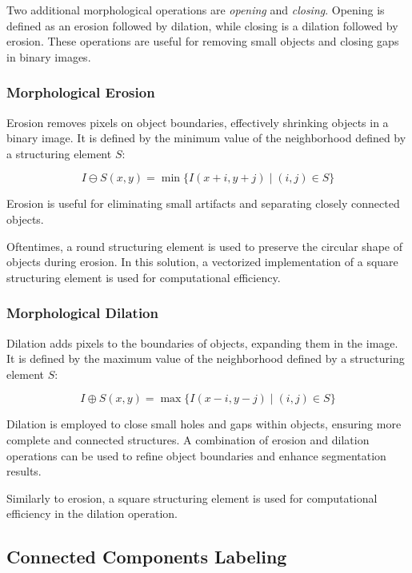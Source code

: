 \documentclass[a4paper,12pt]{article}
\begin{document}
Two additional morphological operations are \textit{opening} and \textit{closing}. Opening is defined as an erosion followed by dilation, while closing is a dilation followed by erosion. These operations are useful for removing small objects and closing gaps in binary images.

\subsubsection{Morphological Erosion}

Erosion removes pixels on object boundaries, effectively shrinking objects in a binary image. It is defined by the minimum value of the neighborhood defined by a structuring element \( S \):

\[
I \ominus S (x, y) = \min \{ I(x + i, y + j) \mid (i, j) \in S \}
\]

Erosion is useful for eliminating small artifacts and separating closely connected objects.

Oftentimes, a round structuring element is used to preserve the circular shape of objects during erosion. In this solution, a vectorized implementation of a square structuring element is used for computational efficiency.

\subsubsection{Morphological Dilation}

Dilation adds pixels to the boundaries of objects, expanding them in the image. It is defined by the maximum value of the neighborhood defined by a structuring element \( S \):

\[
I \oplus S (x, y) = \max \{ I(x - i, y - j) \mid (i, j) \in S \}
\]

Dilation is employed to close small holes and gaps within objects, ensuring more complete and connected structures. A combination of erosion and dilation operations can be used to refine object boundaries and enhance segmentation results.

Similarly to erosion, a square structuring element is used for computational efficiency in the dilation operation.


\subsection{Connected Components Labeling}
\end{document}
